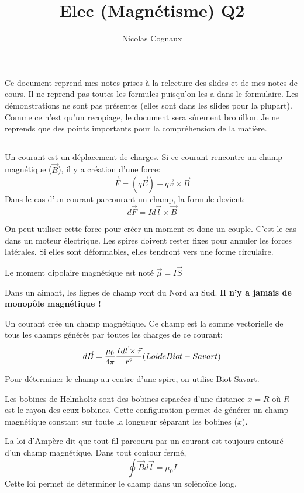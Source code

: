 \documentclass[11pt,a4paper]{article} %
\title{Elec (Magnétisme) Q2}
\author{Nicolas Cognaux}
\newcommand{\B}{\vec B}
\begin{document}
\maketitle
Ce document reprend mes notes prises à la relecture des slides et de mes notes de cours. Il ne reprend pas toutes les formules puisqu'on les a dans le formulaire. Les démonstrations ne sont pas présentes (elles sont dans les slides pour la plupart). 
Comme ce n'est qu'un recopiage, le document sera sûrement brouillon. Je ne reprends que des points importants pour la compréhension de la matière.

\rule{\linewidth}{.5pt}


Un courant est un déplacement de charges. Si ce courant rencontre un champ magnétique ($\vec B$), il y a création d'une force:
$$ \vec F = (q \vec E) + q \vec v \times \B $$
Dans le cas d'un courant parcourant un champ, la formule devient:
$$ d\vec F = Id\vec l \times \B $$

On peut utiliser cette force pour créer un moment et donc un couple. C'est le cas dans un moteur électrique. Les spires doivent rester fixes pour annuler les forces latérales. Si elles sont déformables, elles tendront vers une forme circulaire.

Le moment dipolaire magnétique est noté $\vec \mu = I \vec S $

Dans un aimant, les lignes de champ vont du Nord au Sud. { \bf Il n'y a jamais de monopôle magnétique !}

Un courant crée un champ magnétique. Ce champ est la somme vectorielle de tous les champs générés par toutes les charges de ce courant:
$$ d\B = \frac{\mu_0}{4\pi}\frac{Id\vec l\times \vec r}{r^2} \textrm(Loi de Biot-Savart)$$

Pour déterminer le champ au centre d'une spire, on utilise Biot-Savart.

Les bobines de Helmholtz sont des bobines espacées d'une distance $x = R$ où $R$ est le rayon des eeux bobines. Cette configuration permet de générer un champ magnétique constant sur toute la longueur séparant les bobines ($x$).

La loi d'Ampère dit que tout fil parcouru par un courant est toujours entouré d'un champ magnétique. Dans tout contour fermé,
$$\oint \B d\vec l = \mu_0 I$$
Cette loi permet de déterminer le champ dans un solénoïde long.
\end{document}

